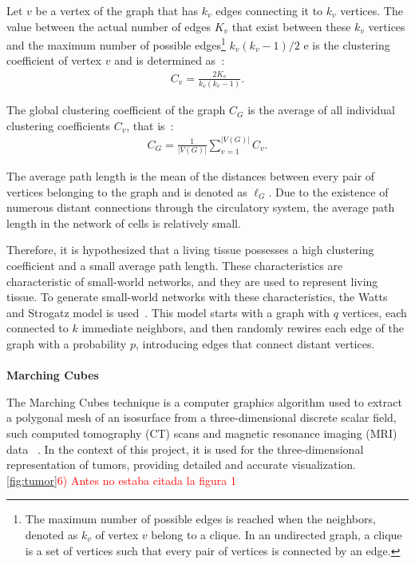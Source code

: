\documentclass[a4paper,11pt]{article}
\begin{document}
{Let $v$ be a vertex of the graph that has $k_v$ edges connecting it to $k_v$ vertices. The value between the actual number of edges $K_v$ that exist between these $k_v$ vertices and the maximum number of possible edges\footnote{The maximum number of possible edges is reached when the neighbors, denoted as $k_v$ of vertex $v$ belong to a clique. In an undirected graph, a clique is a set of vertices such that every pair of vertices is connected by an edge.} $k_v(k_v-1)/2$ e is the clustering coefficient of vertex $v$ and is determined as~\cite{7}:
\begin{align}
C_v = \displaystyle\frac{2K_v}{k_v(k_v-1)}. \label{eq-clustering}
\end{align}

The global clustering coefficient of the graph $C_G$ is the average of all individual clustering coefficients $C_v$, that is~\cite{7}:
\begin{align}
C_G = \displaystyle\frac{1}{|V(G)|}\sum _{v=1} ^{|V(G)|} C_v. \label{eq-global-clustering}
\end{align}

The average path length is the mean of the distances between every pair of vertices belonging to the graph and is denoted as $\ell_G$. Due to the existence of numerous distant connections through the circulatory system, the average path length in the network of cells is relatively small.

Therefore, it is hypothesized that a living tissue possesses a high clustering coefficient and a small average path length. These characteristics are characteristic of small-world networks, and they are used to represent living tissue. To generate small-world networks with these characteristics, the Watts and Strogatz model is used~\cite{9}. This model starts with a graph with $q$ vertices, each connected to $k$ immediate neighbors, and then randomly rewires each edge of the graph with a probability $p$, introducing edges that connect distant vertices.\\
\\
\textbf{Marching Cubes}

The Marching Cubes technique is a computer graphics algorithm used to extract a polygonal mesh of an isosurface from a three-dimensional discrete scalar field, such computed tomography (CT) scans and magnetic resonance imaging (MRI) data ~\cite{5}. In the context of this project, it is used for the three-dimensional representation of tumors, providing detailed and accurate visualization.\ref{fig:tumor}\textcolor{red}{6) Antes no estaba citada la figura 1}

}
\end{document}
